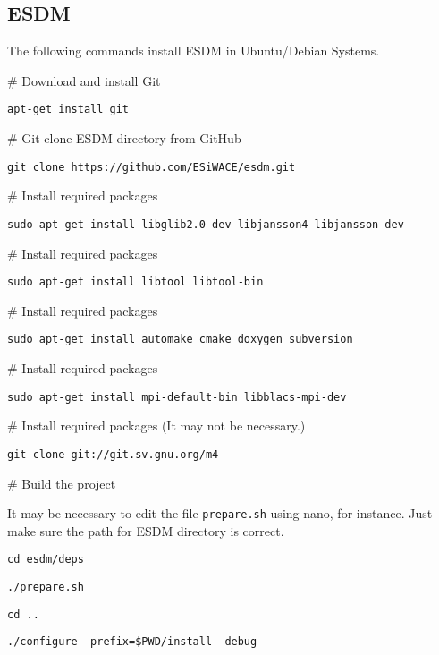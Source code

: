 \subsection{ESDM}
\label{doc:esdm}

\tab
The following commands install ESDM in Ubuntu/Debian Systems.

\begin{framed}

\# Download and install Git

\texttt{apt-get install git}

\# Git clone ESDM directory from GitHub

\texttt{git clone https://github.com/ESiWACE/esdm.git}

\end{framed}

\begin{framed}

\# Install required packages

\texttt{sudo apt-get install libglib2.0-dev libjansson4 libjansson-dev}

\# Install required packages

\texttt{sudo apt-get install libtool libtool-bin}

\# Install required packages

\texttt{sudo apt-get install automake cmake doxygen subversion}

\# Install required packages

\texttt{sudo apt-get install mpi-default-bin libblacs-mpi-dev}

\# Install required packages (It may not be necessary.)

\texttt{git clone git://git.sv.gnu.org/m4}

\end{framed}

\begin{framed}

\# Build the project

It may be necessary to edit the file \texttt{prepare.sh} using nano, for instance. Just make sure the path for ESDM directory is correct.

\texttt{cd esdm/deps}

\texttt{./prepare.sh}

\texttt{cd ..}

\texttt{./configure --prefix=\$PWD/install --debug}

\end{framed}

